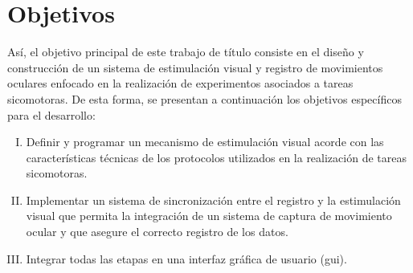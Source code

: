 \documentclass[../main.tex]{subfiles}
\begin{document}
	\section{Objetivos}
	\label{sec:01_objetivos}
		Así, el objetivo principal de este trabajo de título consiste en el diseño y construcción de un sistema de estimulación visual y registro de movimientos oculares enfocado en la realización de experimentos asociados a tareas sicomotoras. De esta forma, se presentan a continuación los objetivos específicos para el desarrollo: 
		
		\begin{enumerate}[(I)]\setlength\itemsep{-0.5em}
			\item Definir y programar un mecanismo de estimulación visual acorde con las características técnicas de los protocolos utilizados en la realización de tareas sicomotoras.
			
			\item Implementar un sistema de sincronización entre el registro y la estimulación visual que permita la integración de un sistema de captura de movimiento ocular y que asegure el correcto registro de los datos.
			
			\item Integrar todas las etapas en una interfaz gráfica de usuario (\acrshort{gui}). 	
		
		\end{enumerate}

\end{document}

